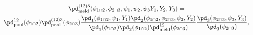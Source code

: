 \begin{multline}
  \pd_{\text{meld}}^{(12)3}(\phi_{1 \cap 2}, \phi_{2 \cap 3}, \psi_{1}, \psi_{2}, \psi_{3} Y_{1}, Y_{2}, Y_{3}) = \\
    \pd_{\text{pool}}^{12}(\phi_{1 \cap 2})
    \pd_{\text{pool}}^{(12)3}(\phi_{2 \cap 3}) 
    \frac{
      \pd_{1}(\phi_{1 \cap 2}, \psi_{1}, Y_{1})
      \pd_{2}(\phi_{1 \cap 2}, \phi_{2 \cap 3}, \psi_{2}, Y_{2})
    } {
      \pd_{1}(\phi_{1 \cap 2})
      \pd_{2}(\phi_{1 \cap 2})
      \pd_{\text{meld}}^{12}(\phi_{2 \cap 3})
    }
    \frac{
      \pd_{3}(\phi_{2 \cap 3}, \psi_{3}, Y_{3})
    } {
      \pd_{3}(\phi_{2 \cap 3})
    },
  \label{eqn:expanded-double-melded-model}
\end{multline}